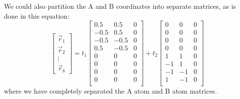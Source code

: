 We could also partition the A and B coordinates into separate matrices, as is done in this equation:
$$
\begin{bmatrix}
\vec{r}_1 \\
\vec{r}_2 \\
\vdots \\
\vec{r}_8
\end{bmatrix}
= 
t_1
\begin{bmatrix}
0.5&0.5&0 \\
-0.5&0.5&0 \\
-0.5&-0.5&0 \\
0.5&-0.5&0 \\
0&0&0 \\
0&0&0 \\
0&0&0 \\
0&0&0 \\
\end{bmatrix}
+
t_2
\begin{bmatrix}
0&0&0 \\
0&0&0 \\
0&0&0 \\
0&0&0 \\
1&1&0 \\
-1&1&0 \\
-1&-1&0 \\
1&-1&0 \\
\end{bmatrix}
$$
where we have completely separated the A atom and B atom matrices. 


